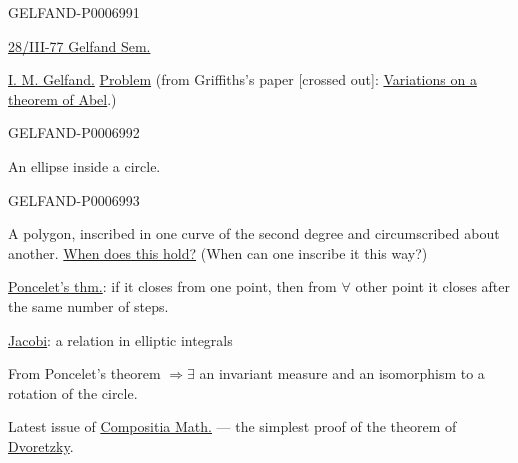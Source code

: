 \begin{GelfandAdjacentEvidence}{GELFAND-P000699}{1}

\underline{28/III-77 }\qquad\underline{Gelfand Sem.}

\underline{I. M. Gelfand.}\qquad
\underline{Problem} (from Griffiths’s paper [crossed out]:
\href{https://publications.ias.edu/pg/paper/214}{Variations on a theorem of Abel}.)
\end{GelfandAdjacentEvidence}
\begin{GelfandAdjacentEvidence}{GELFAND-P000699}{2}


An ellipse inside a circle.

\end{GelfandAdjacentEvidence}
\begin{GelfandAdjacentEvidence}{GELFAND-P000699}{3}


A polygon, inscribed in one curve of the second degree and circumscribed about another.
\underline{When does this hold?} (When can one inscribe it this way?)

\underline{Poncelet’s thm.}: if it closes from one point, then from \(\forall\) other point it closes after the same number of steps.

\underline{Jacobi}: a relation in elliptic integrals

From Poncelet’s theorem \(\Rightarrow\exists\) an invariant measure and an isomorphism to a rotation of the circle.

Latest issue of \href{https://www.numdam.org/item/CM_1976__33_3_297_0/}{\underline{Compositia Math.}}
--- the simplest proof of the theorem of \underline{Dvoretzky}.
\end{GelfandAdjacentEvidence}
